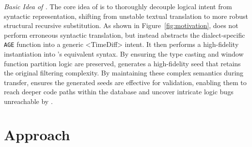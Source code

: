 \documentclass[sigconf,review,anonymous]{acmart}
\begin{document}
\textit{Basic Idea of \tool{}.}
The core idea of \tool{} is to thoroughly decouple logical intent from syntactic representation, shifting from unstable textual translation to more robust structural recursive substitution. 
As shown in Figure~\ref{fig:motivation}, \tool{} does not perform erroneous syntactic translation,
but instead abstracts the dialect-specific \texttt{AGE} function into a generic <TimeDiff> intent. 
It then performs a high-fidelity instantiation into \duckdb{}’s equivalent syntax. By ensuring the type casting and window function partition logic are preserved, \tool{} generates a high-fidelity seed that retains the original filtering complexity. 
By maintaining these complex semantics during transfer, \tool{} ensures the generated seeds are effective for validation, enabling them to reach deeper code paths within the database and uncover intricate logic bugs unreachable by \sedar{}.

\section{Approach}
\label{sec:approach}
\end{document}
